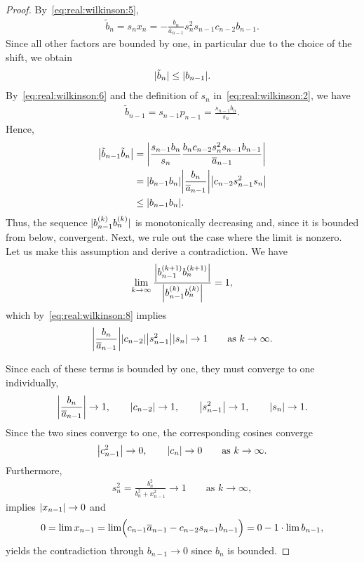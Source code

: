 \begin{proof}
By~\eqref{eq:real:wilkinson:5},
\begin{gather}
  \tilde b_n = s_n x_n
  = - \frac{b_n}{\overline a_{n-1}} s_n^2 s_{n-1} c_{n-2} b_{n-1}.
\end{gather}
Since all other factors are bounded by one, in particular due to the
choice of the shift, we obtain
\begin{gather}
  \label{eq:real:wilkinson:7}
  \abs{\tilde b_n} \le \abs{b_{n-1}}.
\end{gather}
By~\eqref{eq:real:wilkinson:6} and the definition of $s_{n}$
in~\eqref{eq:real:wilkinson:2}, we have
\begin{gather}
  \tilde b_{n-1} = s_{n-1} p_{n-1} = \frac{s_{n-1}b_n}{s_n}.
\end{gather}
Hence,
\begin{align}
  \abs*{\tilde b_{n-1}\tilde b_{n}}
  &= \abs*{\frac{s_{n-1}b_{n}}{s_n}
    \frac{b_nc_{n-2}s_n^2s_{n-1}b_{n-1}}{\overline a_{n-1}}}\\
  \label{eq:real:wilkinson:8}
  &= \abs*{b_{n-1}b_{n}}\abs*{\frac{b_n}{\overline a_{n-1}}}
    \abs*{c_{n-2}s_{n-1}^2s_n}\\
  \label{eq:real:wilkinson:9}
    &\le \abs*{b_{n-1}b_{n}}.
\end{align}
Thus, the sequence $\abs{b_{n-1}^{(k)}b_{n}^{(k)}}$ is monotonically
decreasing and, since it is bounded from below, convergent.
Next, we rule out the case where the limit is nonzero. Let
us make this assumption and derive a contradiction. We have
\begin{gather}
  \lim_{k\to\infty}
  \frac{\abs*{b_{n-1}^{(k+1)}b_{n}^{(k+1)}}}%
  {\abs*{b_{n-1}^{(k)}b_{n}^{(k)}}}
  = 1,
\end{gather}
which by~\eqref{eq:real:wilkinson:8} implies
\begin{gather}
  \abs*{\frac{b_n}{\overline a_{n-1}}}
  \abs*{c_{n-2}}\abs*{s_{n-1}^2}\abs*{s_n} \to 1
  \qquad\text{as } k\to \infty.
\end{gather}

Since each of these terms is bounded by one, they must converge to one
individually,
\begin{gather}
  \abs*{\frac{b_n}{\overline a_{n-1}}} \to 1,\qquad
  \abs*{c_{n-2}} \to 1,\qquad
  \abs*{s_{n-1}^2} \to 1,\qquad
  \abs*{s_n} \to 1.
\end{gather}
Since the two sines converge to one, the corresponding cosines converge
\begin{gather}
  \abs*{c_{n-1}^2} \to 0,\qquad \abs*{c_n} \to 0 \qquad\text{as } k\to \infty.
\end{gather}
Furthermore,
\begin{gather}
  s_n^2 = \frac{b_n^2}{b_n^2+x_{n-1}^2} \to 1 \qquad\text{as } k\to \infty,
\end{gather}
implies $\abs{x_{n-1}} \to 0$ and
\begin{gather}
  0 = \lim x_{n-1}
  = \lim \Bigl(c_{n-1}\overline a_{n-1} - c_{n-2}s_{n-1}b_{n-1}\Bigr)
  = 0 - 1\cdot \lim b_{n-1},
\end{gather}
yields the contradiction through $b_{n-1} \to 0$ since $b_n$ is bounded.


\end{proof}
